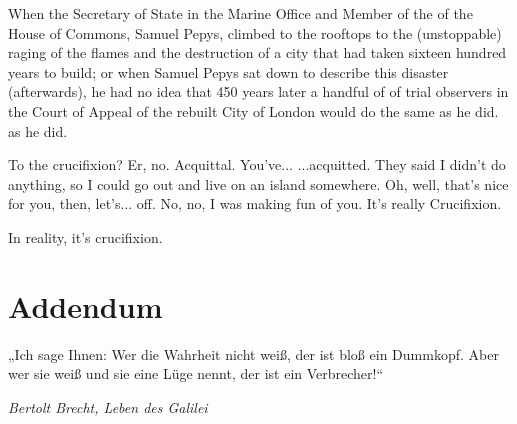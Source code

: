 \begin{multicols}{2}
When the Secretary of State in the Marine Office and Member of the
of the House of Commons, Samuel Pepys, climbed to the rooftops to
the (unstoppable) raging of the flames and the destruction of a city that had taken sixteen hundred years to build; or
when Samuel Pepys sat down to describe this disaster
(afterwards), he had no idea that 450 years later a handful of
of trial observers in the Court of Appeal of the rebuilt City of London would do the same as he did.
as he did.

To the crucifixion? Er, no. Acquittal. You've...
...acquitted. They said I didn't do anything,
so I could go out and live on an island somewhere. Oh, well, that's nice for you, then, let's...
off. No, no, I was making fun of you. It's really Crucifixion.

In reality, it's crucifixion.




\chapter{Addendum}  %

\epigraph{„Ich sage Ihnen: Wer die Wahrheit nicht weiß, der ist bloß ein Dummkopf. Aber wer sie weiß und sie eine Lüge nennt, der ist ein Verbrecher!“}{\textit{Bertolt Brecht, Leben des Galilei}}




\end{multicols}
